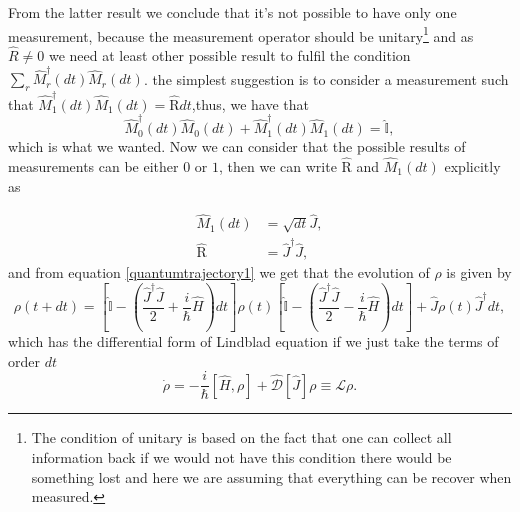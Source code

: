 From the latter result we conclude that it's not possible to have only one measurement, because the measurement operator should be unitary\footnote{The condition of unitary is based on the fact that one can collect all information back if we would not have this condition there would be something lost and here we are assuming that everything can be recover when measured.} and as $\hat{R}\neq 0$ we need at least other possible result to fulfil the condition $\sum_r\hat{M}_r^{\dagger}(dt)\hat{M}_r(dt)$. the simplest suggestion is to consider a measurement such that $\hat{M}^{\dagger}_1(dt)\hat{M}_1(dt)=\hat{\text{R}}dt$,thus, we have that
\[\hat{M}^{\dagger}_0(dt)\hat{M}_0(dt)+\hat{M}^{\dagger}_1(dt)\hat{M}_1(dt)=\hat{\mathbb{I}},\]
which is what we wanted. Now we can consider that the possible results of measurements can be either $0$ or $1$, then we can write $\hat{\text{R}}$ and $\hat{M}_{1}(dt)$ explicitly as

\begin{align*}
\hat{M}_{1}(dt)&=\sqrt{dt}\hat{J},\\
\hat{\text{R}}&=\hat{J}^{\dagger}\hat{J},
\end{align*}
and from equation \eqref{quantumtrajectory1} we get that the evolution of $\rho$ is given by
\begin{equation}
\rho(t+dt)=\left[\hat{\mathbb{I}}-(\frac{\hat{J}^{\dagger}\hat{J}}{2}+\frac{i}{\hbar}\hat{H})dt\right]\rho(t)\left[\hat{\mathbb{I}}-(\frac{\hat{J}^{\dagger}\hat{J}}{2}-\frac{i}{\hbar}\hat{H})dt\right]+\hat{J}\rho(t)\hat{J}^{\dagger}dt,
\label{trajectory3}
\end{equation}
which has the differential form of Lindblad equation if we just take the terms of order $dt$
\begin{equation}
\dot{\rho}=-\frac{i}{\hbar}[\hat{H},\rho]+\hat{\mathcal{D}}[\hat{J}]\rho\equiv\mathcal{L}\rho.
\label{lindblad2}
\end{equation}
